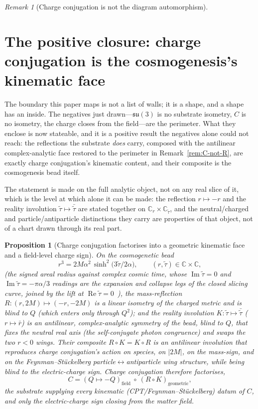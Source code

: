 \documentclass[11pt]{article}
\theoremstyle{plain}
\newtheorem{proposition}{Proposition}
\theoremstyle{remark}
\newtheorem{remark}{Remark}
\newcommand{\su}{\mathfrak{su}}
\begin{document}
\begin{remark}[Charge conjugation is not the diagram automorphism]
\end{remark}


\section{The positive closure: charge conjugation is the cosmogenesis's kinematic face}\label{sec:closure}

The boundary this paper maps is not a list of walls; it is a shape, and a shape has an inside. The negatives just drawn---$\su(3)$ is no substrate isometry, $C$ is no isometry, the charge closes from the field---are the perimeter. What they enclose is now stateable, and it is a positive result the negatives alone could not reach: the reflections the substrate \emph{does} carry, composed with the antilinear complex-analytic face restored to the perimeter in Remark~\ref{rem:C-not-R}, are exactly charge conjugation's kinematic content, and their composite is the cosmogenesis bead itself.

The statement is made on the full analytic object, not on any real slice of it, which is the level at which alone it can be made: the reflection $r\mapsto-r$ and the reality involution $\tilde\tau\mapsto\bar{\tilde\tau}$ are stated together on $\mathbb{C}_r\times\mathbb{C}_{\tilde\tau}$, and the neutral/charged and particle/antiparticle distinctions they carry are properties of that object, not of a chart drawn through its real part.

\begin{proposition}[Charge conjugation factorises into a geometric kinematic face and a field-level charge sign]\label{prop:conjugation-closure}
On the cosmogenetic bead
\[
r^{3}=2M\alpha^{2}\,\sinh^{2}\!\bigl(3\tilde\tau/2\alpha\bigr),
\qquad (r,\tilde\tau)\in\mathbb{C}\times\mathbb{C},
\]
(the signed areal radius against complex cosmic time, whose $\operatorname{Im}\tilde\tau=0$ and $\operatorname{Im}\tilde\tau=-\pi\alpha/3$ readings are the expansion and collapse legs of the closed slicing curve, joined by the lift at $\operatorname{Re}\tilde\tau=0$~\cite{JanzenCRframework,JanzenSlicing}), the mass-reflection $R:(r,2M)\mapsto(-r,-2M)$ is a linear isometry of the charged metric and is blind to $Q$ (which enters only through $Q^{2}$); and the reality involution $K:\tilde\tau\mapsto\bar{\tilde\tau}$ ($r\mapsto\bar r$) is an antilinear, complex-analytic symmetry of the bead, blind to $Q$, that fixes the neutral real axis (the self-conjugate photon congruence) and swaps the two $r<0$ wings. Their composite $R\circ K=K\circ R$ is an antilinear involution that reproduces charge conjugation's action on species, on $|2M|$, on the mass-sign, and on the Feynman--St\"uckelberg particle$\leftrightarrow$antiparticle wing structure, while being blind to the electric-charge sign. Charge conjugation therefore factorises,
\[
C=(Q\mapsto-Q)_{\mathrm{field}}\ \circ\ (R\circ K)_{\mathrm{geometric}},
\]
the substrate supplying every kinematic (CPT/Feynman--St\"uckelberg) datum of $C$, and only the electric-charge sign closing from the matter field.
\end{proposition}
\end{document}
